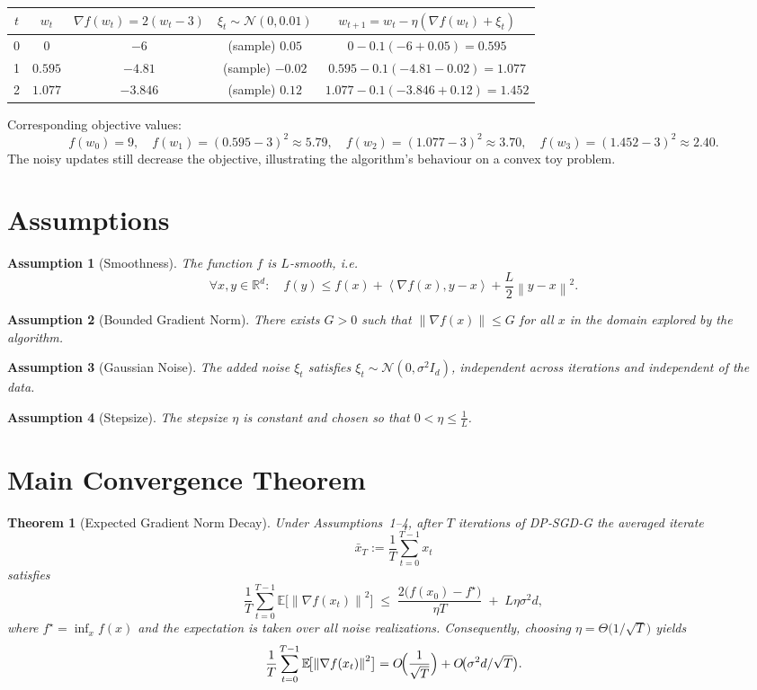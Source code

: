 \documentclass{article}
\newtheorem{theorem}{Theorem}
\newtheorem{assumption}{Assumption}
\newcommand{\E}{\mathbb{E}}
\newcommand{\norm}[1]{\left\lVert#1\right\rVert}
\newcommand{\inner}[2]{\left\langle #1,#2\right\rangle}
\begin{document}
\begin{tabular}{c c c c c}
\toprule
$t$ & $w_t$ & $\nabla f(w_t)=2(w_t-3)$ & $\xi_t\sim\mathcal N(0,0.01)$ & $w_{t+1}=w_t-\eta(\nabla f(w_t)+\xi_t)$ \\
\midrule
0 & $0$ & $-6$ & (sample) $0.05$ & $0-0.1(-6+0.05)=0.595$ \\
1 & $0.595$ & $-4.81$ & (sample) $-0.02$ & $0.595-0.1(-4.81-0.02)=1.077$ \\
2 & $1.077$ & $-3.846$ & (sample) $0.12$ & $1.077-0.1(-3.846+0.12)=1.452$ \\
\bottomrule
\end{tabular}

Corresponding objective values:
\[
f(w_0)=9,\quad f(w_1)=(0.595-3)^2\approx5.79,\quad
f(w_2)=(1.077-3)^2\approx3.70,\quad
f(w_3)=(1.452-3)^2\approx2.40.
\]
The noisy updates still decrease the objective, illustrating the algorithm’s behaviour on a convex toy problem.

\newpage
\section*{Assumptions}
\begin{assumption}[Smoothness]
The function $f$ is $L$‑smooth, i.e.
\[
\forall x,y\in\mathbb R^{d}:\quad
f(y)\le f(x)+\inner{\nabla f(x)}{y-x}+\frac{L}{2}\norm{y-x}^{2}.
\]
\end{assumption}
\begin{assumption}[Bounded Gradient Norm]
There exists $G>0$ such that $\norm{\nabla f(x)}\le G$ for all $x$ in the domain explored by the algorithm.
\end{assumption}
\begin{assumption}[Gaussian Noise]
The added noise $\xi_t$ satisfies $\xi_t\sim\mathcal N(0,\sigma^{2}I_d)$, independent across iterations and independent of the data.
\end{assumption}
\begin{assumption}[Stepsize]
The stepsize $\eta$ is constant and chosen so that $0<\eta\le \frac{1}{L}$.
\end{assumption}

\section*{Main Convergence Theorem}
\begin{theorem}[Expected Gradient Norm Decay]\label{thm:main}
Under Assumptions~1–4, after $T$ iterations of DP‑SGD‑G the averaged iterate
\[
\bar x_T:=\frac{1}{T}\sum_{t=0}^{T-1}x_t
\]
satisfies
\[
\frac{1}{T}\sum_{t=0}^{T-1}\E\!\bigl[\norm{\nabla f(x_t)}^{2}\bigr]
\;\le\;
\frac{2\bigl(f(x_0)-f^{\star}\bigr)}{\eta T}
\;+\;
L\eta\sigma^{2}d,
\]
where $f^{\star}=\inf_{x}f(x)$ and the expectation is taken over all noise realizations.
Consequently, choosing $\eta = \Theta\!\bigl(1/\sqrt{T}\bigr)$ yields
\[
\frac{1}{T}\sum_{t=0}^{T-1}\E\!\bigl[\norm{\nabla f(x_t)}^{2}\bigr]
= O\!\Bigl(\frac{1}{\sqrt{T}}\Bigr)+O\!\bigl(\sigma^{2}d/\sqrt{T}\bigr).
\]
\end{theorem}
\end{document}
